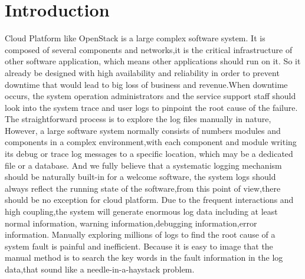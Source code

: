 

\section{Introduction}

Cloud Platform like OpenStack is a large complex software system. It is composed of several components and networks,it is the critical infrastructure of other software application, which means other applications should run on it. So  it already be designed with high availability and reliability in order to prevent downtime that would lead to big loss of business and revenue.When downtime occurs, the system operation administrators and the service support staff should look into the system trace and user logs to pinpoint the root cause of the failure. The straightforward process is to explore the log files manually in nature, However, a large software system normally consists of numbers modules and components in a complex environment,with each component and module writing its debug or trace log messages to a specific location, which may be a dedicated file or a database. And we fully believe that a systematic logging mechanism should be naturally built-in for a welcome software, the system logs should always reflect the running state of the software,from this point of view,there should be no exception for cloud platform. Due to the frequent interactions and high coupling,the system will generate enormous log data including at least normal information, warning information,debugging information,error information. Manually exploring millions of logs to find the root cause of a system fault is painful and inefficient. Because it is easy to image that the manual method is to search the key words in the fault information in the log data,that sound like a needle-in-a-haystack problem\cite{rao2011identifying}. \\


